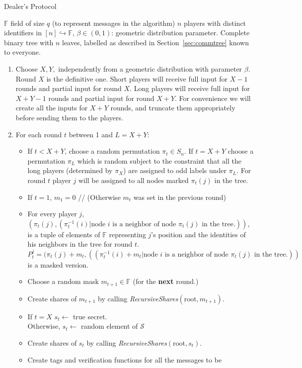 \documentclass[12pt]{article}
\theoremstyle{definition}
\renewcommand{\S}{\mathcal{S}}
\newcommand{\F}{\mathbb{F}}
\newcommand{\recursiveShares}{\emph{RecursiveShares}\xspace}
\begin{document}
\begin{algorithm}
\caption{Dealer's Protocol} \label{alg:Dealer} 
$\F$ field of size $q$ (to represent messages in the algorithm)
$n$ players with distinct identifiers in $[n] \hookrightarrow \F$,
$\beta \in (0, 1)$: geometric distribution parameter.
Complete binary tree with $n$ leaves, labelled as described in 
Section~\ref{sec:commtree} known to everyone.
\begin{enumerate}
\item Choose $X, Y,$ independently from a geometric distribution with 
parameter $\beta$. Round $X$ is the definitive one. Short players will receive 
full input for $X-1$ rounds and partial input for round $X$. Long players 
will receive full input for $X+Y-1$ rounds and partial input for round $X+Y$. 
For convenience we will create all the inputs for $X+Y$ rounds, and 
truncate them appropriately before sending them to the players.
\item For each round $t$ between 1 and $L=X+Y$:
\begin{itemize}
\item If $t<X+Y$, choose a random permutation $\pi_t \in S_n$. 
If $t=X+Y$ choose a permutation $\pi_L$ which is random subject to the 
constraint that all the long players (determined by $\pi_X$) are assigned 
to odd labels under $\pi_L$.
For round $t$ player $j$ 
will be assigned to all nodes marked $\pi_t(j)$ in the tree. 
\item If $t=1$, $m_1=0$ // (Otherwise $m_t$ was set in the previous round)
\item For every player $j$, $(\pi_t(j), (\pi^{-1}_t(i)| 
\mbox{node }i \mbox{ is a neighbor of node } \pi_{t}(j) \mbox{ in the tree.}))$,
is a tuple of elements of $\F$ representing $j$'s position and the identities 
of his neighbors in the tree for round $t$. 
$P^{j}_t = (\pi_t(j) + m_t, ((\pi^{-1}_t(i) +m_t| 
\mbox{node }i \mbox{ is a neighbor of node } \pi_{t}(j) \mbox{ in the tree.}))$
is a masked version.
\item Choose a random mask $m_{t+1} \in \F$ (for the {\bf next} round.)
\item Create shares of $m_{t+1}$ by calling 
\recursiveShares$(\mbox{root}, m_{t+1})$.
\item If $t = X$ $s_t \leftarrow $ true secret.\\
 Otherwise, $s_t \leftarrow $ random element of $\S$
\item Create shares of $s_t$ by calling \recursiveShares$(\mbox{root}, s_t)$.
\item Create tags and verification functions for all the messages to be 

\end{itemize}
\end{enumerate}
\end{algorithm}
\end{document}
